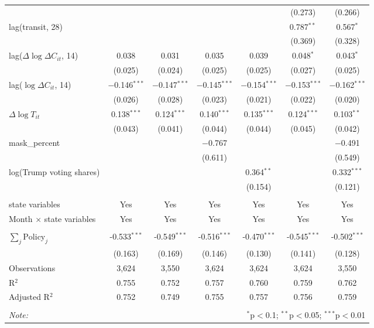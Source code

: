 \begin{tabular}{@{\extracolsep{1pt}}lcccccc}
  &  &  &  &  & (0.273) & (0.266) \\ 
  lag(transit, 28) &  &  &  &  & 0.787$^{**}$ & 0.567$^{*}$ \\ 
  &  &  &  &  & (0.369) & (0.328) \\ 
  lag($\Delta \log \Delta C_{it}$, 14) & 0.038 & 0.031 & 0.035 & 0.039 & 0.048$^{*}$ & 0.043$^{*}$ \\ 
  & (0.025) & (0.024) & (0.025) & (0.025) & (0.027) & (0.025) \\ 
  lag($\log \Delta C_{it}$, 14) & $-$0.146$^{***}$ & $-$0.147$^{***}$ & $-$0.145$^{***}$ & $-$0.154$^{***}$ & $-$0.153$^{***}$ & $-$0.162$^{***}$ \\ 
  & (0.026) & (0.028) & (0.023) & (0.021) & (0.022) & (0.020) \\ 
  $\Delta \log T_{it}$ & 0.138$^{***}$ & 0.124$^{***}$ & 0.140$^{***}$ & 0.135$^{***}$ & 0.124$^{***}$ & 0.103$^{**}$ \\ 
  & (0.043) & (0.041) & (0.044) & (0.044) & (0.045) & (0.042) \\ 
  mask\_percent &  &  & $-$0.767 &  &  & $-$0.491 \\ 
  &  &  & (0.611) &  &  & (0.549) \\ 
  log(Trump voting shares) &  &  &  & 0.364$^{**}$ &  & 0.332$^{***}$ \\ 
  &  &  &  & (0.154) &  & (0.121) \\ 
 \hline \\[-1.8ex] 
state variables & Yes & Yes & Yes & Yes & Yes & Yes \\ 
Month $\times$ state variables & Yes & Yes & Yes & Yes & Yes & Yes \\ 
\hline \\[-1.8ex] 
$\sum_j \mathrm{Policy}_j$ & -0.533$^{***}$ & -0.549$^{***}$ & -0.516$^{***}$ & -0.470$^{***}$ & -0.545$^{***}$ & -0.502$^{***}$ \\ 
 & (0.163) & (0.169) & (0.146) & (0.130) & (0.141) & (0.128) \\ 
Observations & 3,624 & 3,550 & 3,624 & 3,624 & 3,624 & 3,550 \\ 
R$^{2}$ & 0.755 & 0.752 & 0.757 & 0.760 & 0.759 & 0.762 \\ 
Adjusted R$^{2}$ & 0.752 & 0.749 & 0.755 & 0.757 & 0.756 & 0.759 \\ 
\hline 
\hline \\[-1.8ex] 
\textit{Note:}  & \multicolumn{6}{r}{$^{*}$p$<$0.1; $^{**}$p$<$0.05; $^{***}$p$<$0.01} \\ 
\end{tabular} 